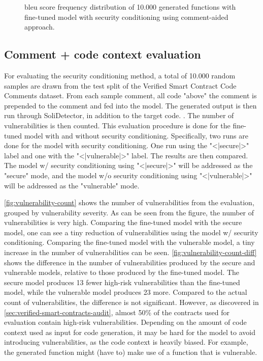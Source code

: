 \begin{figure}[htp]
    \centering
    
    \caption{\acrshort{bleu} score frequency distribution of 10.000 generated functions with fine-tuned model with security conditioning using comment-aided approach.}
    \label{fig:performance-code-context_audit_secure}
\end{figure}

\subsection{Comment + code context evaluation}
\label{sec:eval-rq2-comment-pluss-code-context}
For evaluating the security conditioning method, a total of 10.000 random samples are drawn from the test split of the Verified Smart Contract Code Comments dataset. From each sample comment, all code "above" the comment is prepended to the comment and fed into the model. The generated output is then run through SoliDetector, in addition to the target code. . The number of vulnerabilities is then counted. This evaluation procedure is done for the fine-tuned model with and without security conditioning. Specifically, two runs are done for the model with security conditioning. One run using the "<|secure|>" label and one with the "<|vulnerable|>" label. The results are then compared. The model w/ security conditioning using "<|secure|>" will be addressed as the "secure" mode, and the model w/o security conditioning using "<|vulnerable|>" will be addressed as the "vulnerable" mode.

\cref{fig:vulnerability-count} shows the number of vulnerabilities from the evaluation, grouped by vulnerability severity. As can be seen from the figure, the number of vulnerabilities is very high. Comparing the fine-tuned model with the secure model, one can see a tiny reduction of vulnerabilities using the model w/ security conditioning. Comparing the fine-tuned model with the vulnerable model, a tiny increase in the number of vulnerabilities can be seen. \cref{fig:vulnerability-count-diff} shows the difference in the number of vulnerabilities produced by the secure and vulnerable models, relative to those produced by the fine-tuned model. The secure model produces 13 fewer high-risk vulnerabilities than the fine-tuned model, while the vulnerable model produces 23 more. Compared to the actual count of vulnerabilities, the difference is not significant. However, as discovered in \cref{sec:verified-smart-contracts-audit}, almost 50\% of the contracts used for evaluation contain high-risk vulnerabilities. Depending on the amount of code context used as input for code generation, it may be hard for the model to avoid introducing vulnerabilities, as the code context is heavily biased. For example, the generated function might (have to) make use of a function that is vulnerable.

